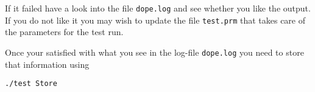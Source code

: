 \begin{enumerate}
  If it failed have a look into the file \texttt{dope.log} and see whether you like the 
  output. If you do not like it you may wish to update the file \texttt{test.prm} that 
  takes care of the parameters for the test run.
  
  Once your satisfied with what you see in the log-file \texttt{dope.log} you need to store 
  that information using
\begin{verbatim}
./test Store
\end{verbatim}
\end{enumerate}


